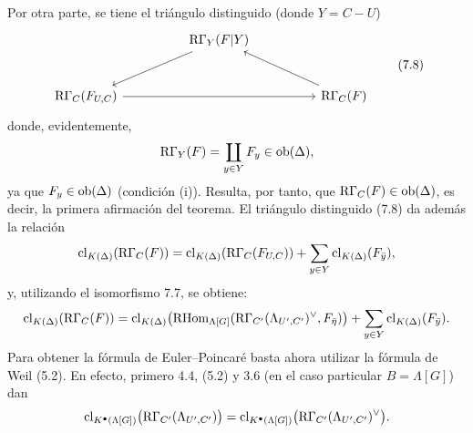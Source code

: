 Por otra parte, se tiene el triángulo distinguido (donde $Y=C-U$)
\[
\begin{tikzcd}[column sep=huge,row sep=large]
& \RG_Y(F|Y) \arrow[dl] & \\
\RG_C(F_{U,C}) \arrow[rr] && \RG_C(F) \arrow[ul]
\end{tikzcd}
\tag{7.8}
\]
donde, evidentemente,
\[
\mathrm{R}\Gamma_Y(F)=\coprod_{y\in Y}F_y\in\operatorname{ob}(\Delta),
\]
ya que $F_y\in\operatorname{ob}(\Delta)$ (condición (i)). Resulta, por tanto, que $\mathrm{R}\Gamma_C(F)\in\operatorname{ob}(\Delta)$, es decir, la primera afirmación del teorema. El triángulo distinguido (7.8) da además la relación
\[
\operatorname{cl}_{K(\Delta)}(\mathrm{R}\Gamma_C(F))
=
\operatorname{cl}_{K(\Delta)}(\mathrm{R}\Gamma_C(F_{U,C}))
+\sum_{y\in Y}\operatorname{cl}_{K(\Delta)}(F_{\bar y}),
\]
y, utilizando el isomorfismo 7.7, se obtiene:
\[
\operatorname{cl}_{K(\Delta)}(\mathrm{R}\Gamma_C(F))
=
\operatorname{cl}_{K(\Delta)}\bigl(\mathrm{RHom}_{\Lambda[G]}(\mathrm{R}\Gamma_{C'}(\Lambda_{U',C'})^\vee,F_{\bar\eta})\bigr)
+\sum_{y\in Y}\operatorname{cl}_{K(\Delta)}(F_{\bar y}).
\]
Para obtener la fórmula de Euler--Poincaré basta ahora utilizar la fórmula de Weil (5.2). En efecto, primero 4.4, (5.2) y 3.6 (en el caso particular $B=\Lambda[G]$) dan
\[
\operatorname{cl}_{K^{\bullet}(\Lambda[G])}\bigl(\mathrm{R}\Gamma_{C'}(\Lambda_{U',C'})\bigr)
=
\operatorname{cl}_{K^{\bullet}(\Lambda[G])}\bigl(\mathrm{R}\Gamma_{C'}(\Lambda_{U',C'})^\vee\bigr).
\]
